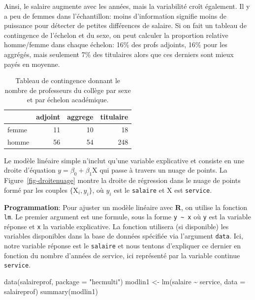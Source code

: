 \documentclass[
  11pt,
  letterpaper,
]{scrbook}
\newenvironment{Shaded}{\begin{snugshade}}{\end{snugshade}}
\newcommand{\AttributeTok}[1]{\textcolor[rgb]{0.40,0.45,0.13}{#1}}
\newcommand{\FunctionTok}[1]{\textcolor[rgb]{0.28,0.35,0.67}{#1}}
\newcommand{\NormalTok}[1]{\textcolor[rgb]{0.00,0.23,0.31}{#1}}
\newcommand{\OtherTok}[1]{\textcolor[rgb]{0.00,0.23,0.31}{#1}}
\newcommand{\SpecialCharTok}[1]{\textcolor[rgb]{0.37,0.37,0.37}{#1}}
\newcommand{\StringTok}[1]{\textcolor[rgb]{0.13,0.47,0.30}{#1}}
\theoremstyle{definition}
\theoremstyle{remark}
\begin{document}
Ainsi, le salaire augmente avec les années, mais la variabilité croît
également. Il y a peu de femmes dans l'échantillon: moins d'information
signifie moins de puissance pour détecter de petites différences de
salaire. Si on fait un tableau de contingence de l'échelon et du sexe,
on peut calculer la proportion relative homme/femme dans chaque échelon:
16\% des profs adjoints, 16\% pour les aggrégés, mais seulement 7\% des
titulaires alors que ces derniers sont mieux payés en moyenne.

\begin{longtable}[]{@{}lrrr@{}}

\caption{\label{tbl-tableaucontingence}Tableau de contingence donnant le
nombre de professeurs du collège par sexe et par échelon académique.}

\tabularnewline

\toprule\noalign{}
& adjoint & aggrege & titulaire \\
\midrule\noalign{}
\endhead
\bottomrule\noalign{}
\endlastfoot
femme & 11 & 10 & 18 \\
homme & 56 & 54 & 248 \\

\end{longtable}

Le modèle linéaire simple n'inclut qu'une variable explicative et
consiste en une droite d'équation \(y=\beta_0 + \beta_1 \mathrm{X}\) qui
passe à travers un nuage de points. La Figure~\ref{fig-droitenuage}
montre la droite de régression dans le nuage de points formé par les
couples \(\{\mathrm{X}_i, y_i\}\), où \(y_i\) est le \texttt{salaire} et
\(\mathrm{X}\) est \texttt{service}.

\textbf{Programmation}: Pour ajuster un modèle linéaire avec \textbf{R},
on utilise la fonction \texttt{lm}. Le premier argument est une formule,
sous la forme \texttt{y\ \textasciitilde{}\ x} où \texttt{y} est la
variable réponse et \texttt{x} la variable explicative. La fonction
utilisera (si disponible) les variables disponibles dans la base de
données spécifiée via l'argument \texttt{data}. Ici, notre variable
réponse est le \texttt{salaire} et nous tentons d'expliquer ce dernier
en fonction du nombre d'années de service, ici représenté par la
variable continue \texttt{service}.

\begin{Shaded}
\begin{Highlighting}[]
\FunctionTok{data}\NormalTok{(salaireprof, }\AttributeTok{package =} \StringTok{"hecmulti"}\NormalTok{)}
\NormalTok{modlin1 }\OtherTok{\textless{}{-}} \FunctionTok{lm}\NormalTok{(salaire }\SpecialCharTok{\textasciitilde{}}\NormalTok{ service, }\AttributeTok{data =}\NormalTok{ salaireprof)}
\FunctionTok{summary}\NormalTok{(modlin1)}
\end{Highlighting}
\end{Shaded}
\end{document}
